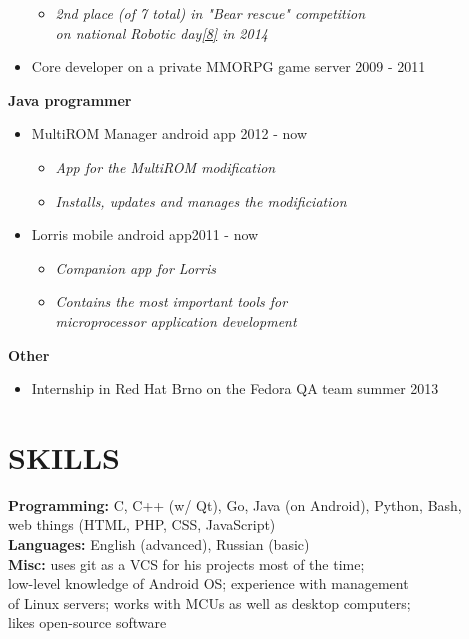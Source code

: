 \documentclass[margin]{res}
\begin{document}
\begin{resume}
\begin{itemize}
\begin{itemize}
            \item \textit{2nd place (of 7 total) in "Bear rescue" competition \\ on national Robotic day\hyperref[day2]{[8]} in 2014}
        \end{itemize}
    \item Core developer on a private MMORPG game server \hfill{2009 - 2011}
 \end{itemize}
 \newpage
 {\bf Java programmer}
 \begin{itemize} \itemsep -2pt
    \item MultiROM Manager android app \hfill{2012 - now}
        \begin{itemize}
            \item \textit{App for the MultiROM modification}
            \item \textit{Installs, updates and manages the modificiation}
        \end{itemize}
    \item Lorris mobile android app\hfill{2011 - now}
        \begin{itemize}
            \item \textit{Companion app for Lorris}
            \item \textit{Contains the most important tools for \\ microprocessor application development}
        \end{itemize}
 \end{itemize}
 {\bf Other}
 \begin{itemize} \itemsep -2pt
    \item Internship in Red Hat Brno on the Fedora QA team \hfill{summer 2013}
 \end{itemize}

\section{SKILLS}
{\bf Programming:} C, C++ (w/ Qt), Go, Java (on Android), Python, Bash,\\web things (HTML, PHP, CSS, JavaScript)\vspace{1.3mm}\\
{\bf Languages:} English (advanced), Russian (basic)\vspace{1.3mm}\\
{\bf Misc:} uses git as a VCS for his projects most of the time; \\ low-level knowledge of Android OS; experience with management\\of Linux servers; works with MCUs as well as desktop computers;\\likes open-source software\vspace{1.3mm}


\end{resume}
\end{document}
